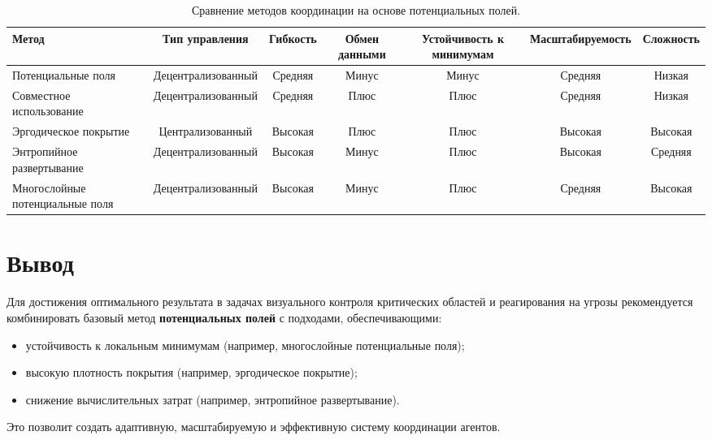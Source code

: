 \begin{table}[h!]
	\centering
	\begin{tabular}{|l|c|c|c|c|c|c|}
		\hline
		\textbf{Метод} & \textbf{Тип управления} & \textbf{Гибкость} & \textbf{Обмен данными} & \textbf{Устойчивость к минимумам} & \textbf{Масштабируемость} & \textbf{Сложность} \\ \hline
		Потенциальные поля & Децентрализованный & Средняя & Минус & Минус & Средняя & Низкая \\ \hline
		Совместное использование & Децентрализованный & Средняя & Плюс & Плюс & Средняя & Низкая \\ \hline
		Эргодическое покрытие & Централизованный & Высокая & Плюс & Плюс & Высокая & Высокая \\ \hline
		Энтропийное развертывание & Децентрализованный & Высокая & Минус & Плюс & Высокая & Средняя \\ \hline
		Многослойные потенциальные поля & Децентрализованный & Высокая & Минус & Плюс & Средняя & Высокая \\ \hline
	\end{tabular}
	\caption{Сравнение методов координации на основе потенциальных полей.}
\end{table}

\section{Вывод}
Для достижения оптимального результата в задачах визуального контроля критических областей и реагирования на угрозы рекомендуется комбинировать базовый метод \textbf{потенциальных полей} с подходами, обеспечивающими:  
\begin{itemize}
	\item устойчивость к локальным минимумам (например, многослойные потенциальные поля);
	\item высокую плотность покрытия (например, эргодическое покрытие);
	\item снижение вычислительных затрат (например, энтропийное развертывание).
\end{itemize}
Это позволит создать адаптивную, масштабируемую и эффективную систему координации агентов.
\fi